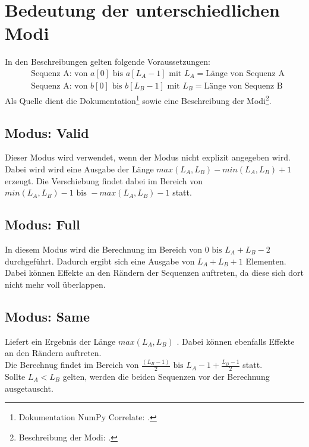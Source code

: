 \section{Bedeutung der unterschiedlichen Modi}
\begin{samepage}
  In den Beschreibungen gelten folgende Voraussetzungen: 
  \begin{align*}
    & \text{Sequenz A: von }a[0] \text{ bis }a[L_A - 1] \text{ mit } L_A = \text{Länge von Sequenz A}\\
    & \text{Sequenz A: von }b[0] \text{ bis }b[L_B - 1] \text{ mit } L_B = \text{Länge von Sequenz B}
  \end{align*}
  Als Quelle dient die Dokumentation\footnote{Dokumentation NumPy Correlate: \cite{DocumentationNumpyCorrelate}.} sowie eine Beschreibung der 
  Modi\footnote{Beschreibung der Modi: \cite{NumPyCorrelationModesExplained}.}.
\end{samepage}


\subsection{Modus: Valid}
Dieser Modus wird verwendet, wenn der Modus nicht explizit angegeben wird.\\
Dabei wird wird eine Ausgabe der Länge $ max(L_A, L_B) - min(L_A, L_B) + 1 $ erzeugt. Die Verschiebung findet dabei im Bereich 
von $ min(L_A, L_B) - 1 \text{ bis } - max(L_A, L_B) - 1 $ statt.

\subsection{Modus: Full}
In diesem Modus wird die Berechnung im Bereich von $ 0 \text{ bis }  L_A + L_B - 2 $ durchgeführt. 
Dadurch ergibt sich eine Ausgabe von $ L_A + L_B + 1 $ Elementen. Dabei können Effekte an den Rändern der Sequenzen auftreten, da diese
sich dort nicht mehr voll überlappen.

\subsection{Modus: Same}
Liefert ein Ergebnis der Länge $ max(L_A, L_B) $ . Dabei können ebenfalls Effekte an den Rändern auftreten.\\
Die Berechnug findet im Bereich von $ \frac{(L_B - 1)}{2} \text{ bis } L_A - 1 + \frac{L_B - 1}{2} $ statt. \\
Sollte $ L_A < L_B $ gelten, werden die beiden Sequenzen vor der Berechnung ausgetauscht.










